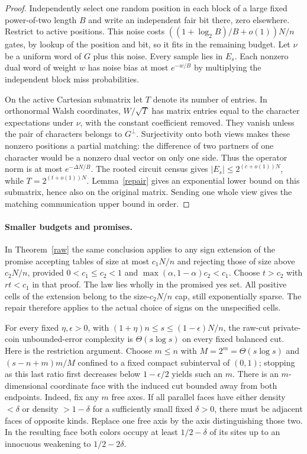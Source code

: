 \documentclass[11pt]{article}
\begin{document}
\begin{proof}
Independently select one random position in each block of a large fixed power-of-two length $B$ and write an independent fair bit there, zero elsewhere. Restrict to active positions. This noise costs $((1+\log_2B)/B+o(1))N/n$ gates, by lookup of the position and bit, so it fits in the remaining budget. Let $\nu$ be a uniform word of $G$ plus this noise. Every sample lies in $E_s$. Each nonzero dual word of weight $w$ has noise bias at most $e^{-w/B}$ by multiplying the independent block miss probabilities.

On the active Cartesian submatrix let $T$ denote its number of entries. In orthonormal Walsh coordinates, $W/\sqrt T$ has matrix entries equal to the character expectations under $\nu$, with the constant coefficient removed. They vanish unless the pair of characters belongs to $G^\perp$. Surjectivity onto both views makes these nonzero positions a partial matching: the difference of two partners of one character would be a nonzero dual vector on only one side. Thus the operator norm is at most $e^{-\Delta N/B}$. The rooted circuit census gives $|E_s|\le2^{(c+o(1))N}$, while $T=2^{(t+o(1))N}$. Lemma~\ref{repair} gives an exponential lower bound on this submatrix, hence also on the original matrix. Sending one whole view gives the matching communication upper bound in order.
\end{proof}


\paragraph{Smaller budgets and promises.}
In Theorem~\ref{raw} the same conclusion applies to any sign extension of the promise accepting tables of size at most $c_1N/n$ and rejecting those of size above $c_2N/n$, provided $0<c_1\le c_2<1$ and $\max(\alpha,1-\alpha)c_2<c_1$. Choose $t>c_2$ with $rt<c_1$ in that proof. The law lies wholly in the promised yes set. All positive cells of the extension belong to the size-$c_2N/n$ cap, still exponentially sparse. The repair therefore applies to the actual choice of signs on the unspecified cells.

For every fixed $\eta,\epsilon>0$, with $(1+\eta)n\le s\le(1-\epsilon)N/n$, the raw-cut private-coin unbounded-error complexity is $\Theta(s\log s)$ on every fixed balanced cut. Here is the restriction argument. Choose $m\le n$ with $M=2^m=\Theta(s\log s)$ and $(s-n+m)m/M$ confined to a fixed compact subinterval of $(0,1)$; stopping as this last ratio first decreases below $1-\epsilon/2$ yields such an $m$. There is an $m$-dimensional coordinate face with the induced cut bounded away from both endpoints. Indeed, fix any $m$ free axes. If all parallel faces have either density $<\delta$ or density $>1-\delta$ for a sufficiently small fixed $\delta>0$, there must be adjacent faces of opposite kinds. Replace one free axis by the axis distinguishing those two. In the resulting face both colors occupy at least $1/2-\delta$ of its sites up to an innocuous weakening to $1/2-2\delta$.
\end{document}
